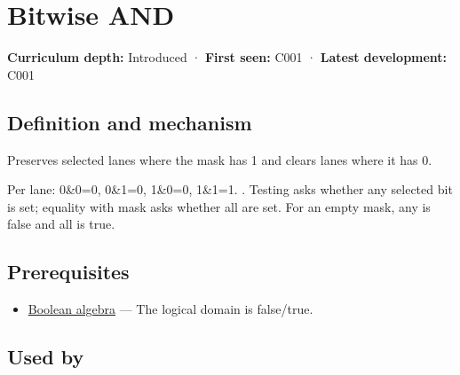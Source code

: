 \hypertarget{appendix-68b52453737c}{}\label{referencestart:appendix-68b52453737c}
\section{Bitwise AND}\label{appendix-68b52453737c-bitwise-and}

\hypertarget{appendix-68b52453737c-bitwise-and}{}

\textbf{Curriculum depth:} Introduced · \textbf{First seen:} C001 · \textbf{Latest development:} C001

\begin{allmightroledefinition}

\subsection{Definition and mechanism}\label{appendix-68b52453737c-definition-and-mechanism}

\hypertarget{appendix-68b52453737c-definition-and-mechanism}{}

Preserves selected lanes where the mask has 1 and clears lanes where it has 0.

\end{allmightroledefinition}

Per lane: 0\&0=0, 0\&1=0, 1\&0=0, 1\&1=1. . Testing  asks whether any selected bit is set; equality with mask asks whether all are set. For an empty mask, any is false and all is true.

\subsection{Prerequisites}\label{appendix-68b52453737c-prerequisites}

\hypertarget{appendix-68b52453737c-prerequisites}{}

\begin{itemize}
\tightlist
\item
  \hyperref[appendix-24475e1596a8]{Boolean algebra} --- The logical domain is false/true.
\end{itemize}

\subsection{Used by}\label{appendix-68b52453737c-used-by}

